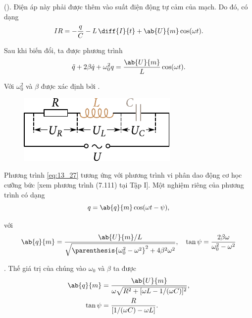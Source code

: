 \noindent
().
Điện áp này phải được thêm vào suất điện động tự cảm của mạch.
Do đó,  có dạng
\begin{equation}\label{eq:13_26}
    IR = - \frac{q}{C} - L\, \diff{I}{t} + \ab{U}{m} \cos(\omega t).
\end{equation}

\noindent
Sau khi biến đổi, ta được phương trình
\begin{equation}\label{eq:13_27}
    \ddot{q} + 2\beta \dot{q} + \omega_0^2 q = \frac{\ab{U}{m}}{L} \cos(\omega t).
\end{equation}

\noindent
Với $\omega_0^2$ và $\beta$ được xác định bởi .

\begin{figure}[t]
	\begin{center}
		\includegraphics[scale=1]{figures/ch_13/fig_13_5.pdf}
		\caption[]{}
		\label{fig:13_5}
	\end{center}
	\vspace{-0.8cm}
\end{figure}

Phương trình \eqref{eq:13_27} tương ứng với phương trình vi phân dao động cơ học cưỡng bức [xem phương trình (7.111) tại Tập I].
Một nghiệm riêng của phương trình có dạng
\begin{equation}\label{eq:13_28}
    q = \ab{q}{m} \cos(\omega t - \psi),
\end{equation}

\noindent
với
\begin{equation*}
    \ab{q}{m} = \frac{\ab{U}{m}/L}{\sqrt{\parenthesis{\omega_0^2-\omega^2}^2 + 4\beta^2\omega^2}},\quad \tan\psi = \frac{2\beta\omega}{\omega_0^2-\omega^2}
\end{equation*}

.
Thế giá trị của chúng vào $\omega_0$ và $\beta$ ta được
\begin{align}
    \ab{q}{m} &= \frac{\ab{U}{m}}{\omega \sqrt{R^2 + [\omega L - 1/(\omega C)]^2}},\label{eq:13_29}\\
    \tan\psi &= \frac{R}{[1/(\omega C) - \omega L]}.\label{eq:13_30}
\end{align}

